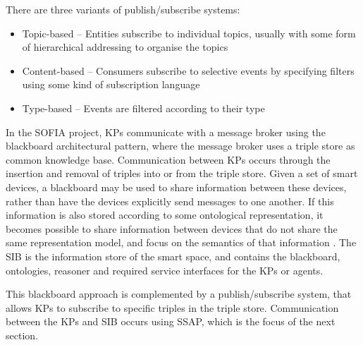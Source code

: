 There are three variants of publish/subscribe systems:

\begin{itemize}
	\item Topic-based -- Entities subscribe to individual topics, usually with some form of hierarchical addressing to organise the topics
	\item Content-based -- Consumers subscribe to selective events by specifying filters using some kind of subscription language
	\item Type-based -- Events are filtered according to their type
\end{itemize}

In the \ac{SOFIA} project, \acp{KP} communicate with a message broker using the blackboard architectural pattern, where the message broker uses a triple store as common knowledge base. Communication between \acp{KP} occurs through the insertion and removal of triples into or from the triple store.  Given a set of smart devices, a blackboard may be used to share information between these devices, rather than have the devices explicitly send messages to one another. If this information is also stored according to some ontological representation, it becomes possible to share information between devices that do not share the same representation model, and focus on the semantics of that information \cite{Oliver2008}. The \ac{SIB} is the information store of the smart space, and contains the blackboard, ontologies, reasoner and required service interfaces for the \acp{KP} or agents.

This blackboard approach is complemented by a publish/subscribe system, that allows \acp{KP} to subscribe to specific triples in the triple store. Communication between the \acp{KP} and \ac{SIB} occurs using \ac{SSAP}, which is the focus of the next section.








